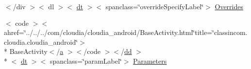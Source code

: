 \begin{DoxyCompactItemize}
$<$/div $>$$<$ dl $>$$<$ \hyperlink{stylesheet_8css_a107565fb4039d33b041380d6e0ea1d80}{dt} $>$$<$ spanclass=\char`\"{}override\-Specify\-Label\char`\"{}$>$ \hyperlink{_sensor_overview_activity_8html_aed76f90ed460c58c4a3ab820f77c466f}{Overrides}
\item 
$<$ code $>$$<$ ahref=\char`\"{}../../../com/cloudia/cloudia\-\_\-android/Base\-Activity.\-html\char`\"{}title=\char`\"{}classincom.\-cloudia.\-cloudia\-\_\-android\char`\"{}$>$\\*
 Base\-Activity$<$/\hyperlink{style_8css_a5e8981582017bb8b84c21f148345d1f7}{a} $>$$<$/code $>$$<$/\hyperlink{stylesheet_8css_a47f4718a86835a7771ec592ece845221}{dd} $>$\\*
$<$ \hyperlink{stylesheet_8css_a107565fb4039d33b041380d6e0ea1d80}{dt} $>$$<$ spanclass=\char`\"{}param\-Label\char`\"{}$>$ \hyperlink{_sensor_overview_activity_8html_a4eb7712dd2f8cbf746bedba580f47f4d}{Parameters}
\end{DoxyCompactItemize}


